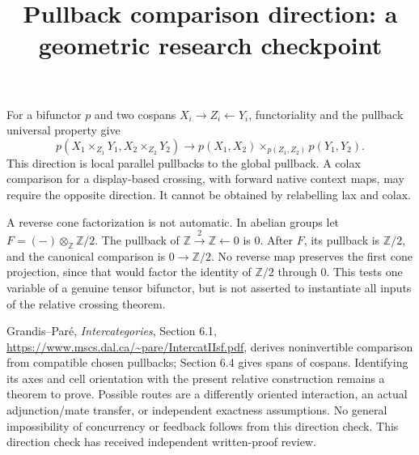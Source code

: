 \documentclass{article}
\title{Pullback comparison direction: a geometric research checkpoint}
\begin{document}
\maketitle
For a bifunctor $p$ and two cospans $X_i\to Z_i\leftarrow Y_i$, functoriality and the pullback universal property give
\[
p(X_1\times_{Z_1}Y_1,X_2\times_{Z_2}Y_2)\longrightarrow
p(X_1,X_2)\times_{p(Z_1,Z_2)}p(Y_1,Y_2).
\]
This direction is local parallel pullbacks to the global pullback. A colax comparison for a display-based crossing, with forward native context maps, may require the opposite direction. It cannot be obtained by relabelling lax and colax.

A reverse cone factorization is not automatic. In abelian groups let $F=(-)\otimes_{\mathbb Z}\mathbb Z/2$. The pullback of $\mathbb Z\xrightarrow{2}\mathbb Z\leftarrow0$ is $0$. After $F$, its pullback is $\mathbb Z/2$, and the canonical comparison is $0\to\mathbb Z/2$. No reverse map preserves the first cone projection, since that would factor the identity of $\mathbb Z/2$ through $0$. This tests one variable of a genuine tensor bifunctor, but is not asserted to instantiate all inputs of the relative crossing theorem.

Grandis--Par\'e, \emph{Intercategories}, Section 6.1, \url{https://www.mscs.dal.ca/~pare/IntercatIIsf.pdf}, derives noninvertible comparison from compatible chosen pullbacks; Section 6.4 gives spans of cospans. Identifying its axes and cell orientation with the present relative construction remains a theorem to prove. Possible routes are a differently oriented interaction, an actual adjunction/mate transfer, or independent exactness assumptions. No general impossibility of concurrency or feedback follows from this direction check. This direction check has received independent written-proof review.
\end{document}
